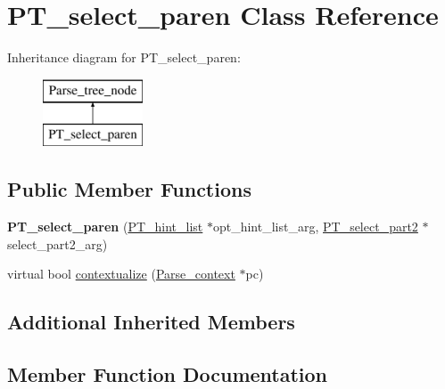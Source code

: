 \hypertarget{classPT__select__paren}{}\section{P\+T\+\_\+select\+\_\+paren Class Reference}
\label{classPT__select__paren}
Inheritance diagram for P\+T\+\_\+select\+\_\+paren\+:\begin{figure}[H]
\begin{center}
\leavevmode
\includegraphics[height=2.000000cm]{classPT__select__paren}
\end{center}
\end{figure}
\subsection*{Public Member Functions}
\begin{DoxyCompactItemize}
\item 
\mbox{\label{classPT__select__paren_acaeda0a1d3785894f929a3e6cb860ddf}} 
{\bfseries P\+T\+\_\+select\+\_\+paren} (\mbox{\hyperlink{classPT__hint__list}{P\+T\+\_\+hint\+\_\+list}} $\ast$opt\+\_\+hint\+\_\+list\+\_\+arg, \mbox{\hyperlink{classPT__select__part2}{P\+T\+\_\+select\+\_\+part2}} $\ast$select\+\_\+part2\+\_\+arg)
\item 
virtual bool \mbox{\hyperlink{classPT__select__paren_a0f3014ee99f77845cf8b686bfcaadeed}{contextualize}} (\mbox{\hyperlink{structParse__context}{Parse\+\_\+context}} $\ast$pc)
\end{DoxyCompactItemize}
\subsection*{Additional Inherited Members}


\subsection{Member Function Documentation}
\mbox{\label{classPT__select__paren_a0f3014ee99f77845cf8b686bfcaadeed}} 
